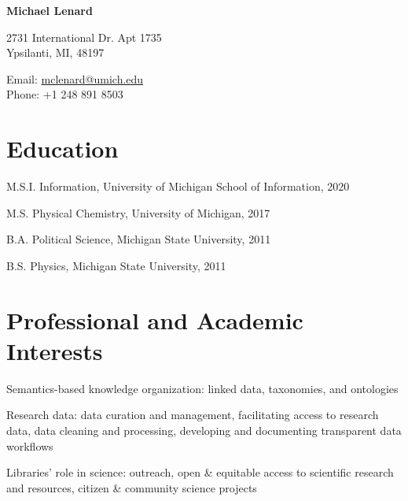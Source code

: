 \documentclass[12pt,letterpaper]{report}
\newcommand{\myname}{Michael Lenard}
\newcommand{\namefont}[1]{{\normalfont\bfseries\Huge{#1}}}
\newcommand{\listitemspace}{0.25em}
\renewenvironment{itemize}
{\begin{list}{}{\setlength{\leftmargin}{0em}
            \setlength{\parskip}{0em}
            \setlength{\itemsep}{\listitemspace}
            \setlength{\parsep}{\listitemspace}}}
{\end{list}}
\begin{document}
 \raggedright

\namefont{\myname}

\vspace{1em}
\begin{minipage}[t]{0.68\textwidth}
        2731 International Dr. Apt 1735 \\
Ypsilanti, MI, 48197
\end{minipage}
\begin{minipage}[t]{0.31\textwidth}
        Email: \href{mailto:mclenard@umich.edu}{mclenard@umich.edu} \\
        Phone: +1 248 891 8503
\end{minipage}
\vspace{0.5em}



\section*{Education}

\begin{tablist}

	\item[M.S.I.] \tab Information, University of Michigan School of Information, 2020

	\item[M.S.]  \tab Physical Chemistry, University of Michigan, 2017

	\item[B.A.]  \tab Political Science, Michigan State University, 2011
        
	\item[B.S.]  \tab Physics, Michigan State University, 2011

\end{tablist}



\section*{Professional and Academic Interests}

\begin{itemize}

	\item Semantics-based knowledge organization: linked data, taxonomies, and ontologies
	
	\item Research data: data curation and management, facilitating access to research data, data cleaning and processing, developing and documenting transparent data workflows

	\item Libraries' role in science: outreach, open \& equitable access to scientific research and resources, citizen \& community science projects

\end{itemize}
\end{document}
